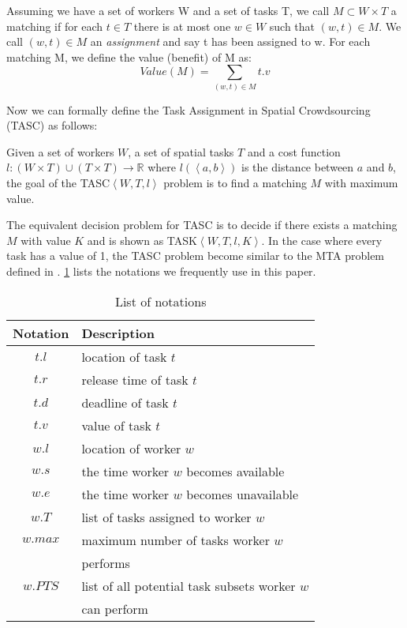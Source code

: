\begin{definition} [Matching]
Assuming we have a set of workers W and a set of tasks T, we call $M \subset W \times T$ a matching if for each $t \in T$ there is at most one $w \in W$ such that $\left( w, t \right) \in M$. We call $\left( w, t \right) \in M$ an \emph{assignment} and say t has been assigned to w. For each matching M, we define the value (benefit) of M as:
\begin{equation*}
Value(M) = \sum_{\left( w, t \right) \in M} t.v
\end{equation*}
\end{definition}

Now we can formally define the Task Assignment in Spatial Crowdsourcing (TASC) as follows:

\begin{definition}
Given a set of workers $W$, a set of spatial tasks $T$ and a cost function $l: \left( W \times T \right) \cup \left( T \times T \right) \rightarrow \mathbb{R}$ where $l \left( \left\langle a,b \right\rangle \right)$ is the distance between $a$ and $b$, the goal of the TASC$\left\langle W, T, l \right\rangle$ problem is to find a matching $M$ with maximum value.
\end{definition}

The equivalent decision problem for TASC is to decide if there exists a matching $M$ with value $K$ and is shown as TASK$\left\langle W, T, l, K \right\rangle$. In the case where every task has a value of 1, the TASC problem become similar to the MTA problem defined in \cite{kazemi12}. \cref{tab:notation} lists the notations we frequently use in this paper.\\

\begin{table}
\label{tab:notation}
\begin{center}
\begin{tabular}{| c | l |} \hline
Notation	&	Description \\ \hline
$t.l$			&	location of task $t$ \\ \hline
$t.r$			&	release time of task $t$ \\ \hline
$t.d$		& 	deadline of task $t$ \\ \hline
$t.v$		&	value of task $t$ \\ \hline
$w.l$		&	location of worker $w$ \\ \hline
$w.s$		&	the time worker $w$ becomes available \\ \hline
$w.e$		&	the time worker $w$ becomes unavailable \\ \hline
$w.T$		&	list of tasks assigned to worker $w$ \\ \hline
$w.max$	&	maximum number of tasks worker $w$ \\
				&	performs \\ \hline
$w.PTS$	&	list of all potential task subsets worker $w$ \\
				&	can perform \\ \hline
\end{tabular}
\caption{List of notations}
\end{center}
\end{table}

